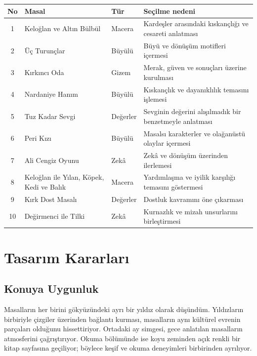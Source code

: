 \documentclass[12pt,a4paper]{article}
\begin{document}
\begin{longtable}{@{}cp{4cm}p{3cm}p{5.4cm}@{}}
\toprule
\textbf{No} & \textbf{Masal} & \textbf{Tür} & \textbf{Seçilme nedeni} \\
\midrule
\endhead
1 & Keloğlan ve Altın Bülbül & Macera & Kardeşler arasındaki kıskançlığı ve cesareti anlatması \\
2 & Üç Turunçlar & Büyülü & Büyü ve dönüşüm motifleri içermesi \\
3 & Kırkıncı Oda & Gizem & Merak, güven ve sonuçları üzerine kurulması \\
4 & Nardaniye Hanım & Büyülü & Kıskançlık ve dayanıklılık temasını işlemesi \\
5 & Tuz Kadar Sevgi & Değerler & Sevginin değerini alışılmadık bir benzetmeyle anlatması \\
6 & Peri Kızı & Büyülü & Masalsı karakterler ve olağanüstü olaylar içermesi \\
7 & Ali Cengiz Oyunu & Zekâ & Zekâ ve dönüşüm üzerinden ilerlemesi \\
8 & Keloğlan ile Yılan, Köpek, Kedi ve Balık & Macera & Yardımlaşma ve iyilik karşılığı temasını göstermesi \\
9 & Kırk Dost Masalı & Değerler & Dostluk kavramını öne çıkarması \\
10 & Değirmenci ile Tilki & Zekâ & Kurnazlık ve mizah unsurlarını birleştirmesi \\
\bottomrule
\end{longtable}

\section{Tasarım Kararları}


\subsection{Konuya Uygunluk}
Masalların her birini gökyüzündeki ayrı bir yıldız olarak düşündüm. Yıldızların birbiriyle çizgiler üzerinden bağlantı kurması, masalların aynı kültürel evrenin parçaları olduğunu hissettiriyor. Ortadaki ay simgesi, gece anlatılan masalların atmosferini çağrıştırıyor. Okuma bölümünde ise koyu zeminden açık renkli bir kitap sayfasına geçiliyor; böylece keşif ve okuma deneyimleri birbirinden ayrılıyor.
\end{document}
